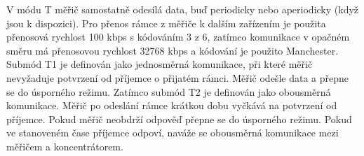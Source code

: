 \begin{table}[!ht]
\centering
\caption{Režimy přenosu WM-Bus protokolu~\cite{WmbusTables}}
\label{TableRezimy}
\end{table}


V	módu T měřič samostatně odesílá data, buď periodicky nebo aperiodicky (když jsou k dispozici). Pro přenos rámce z měřiče k dalším zařízením je použita přenosová rychlost 100 kbps s kódováním 3 z 6, zatímco komunikace v opačném směru má přenosovou rychlost 32768 kbps a kódování je použito Manchester. Submód T1 je definován jako jednosměrná komunikace, při které měřič nevyžaduje potvrzení od příjemce o přijatém rámci. Měřič odešle data a přepne se do úsporného režimu. Zatímco submód T2 je definován jako obousměrná komunikace. Měřič po odeslání rámce krátkou dobu vyčkává na potvrzení od příjemce. Pokud měřič neobdrží odpověď přepne se do úsporného režimu. Pokud ve stanoveném čase příjemce odpoví, naváže se obousměrná komunikace mezi měřičem a koncentrátorem.


